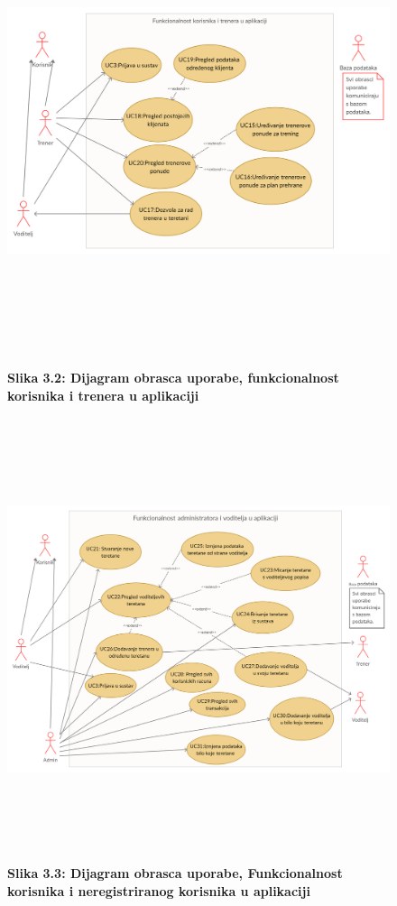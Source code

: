				\begin{figure}
					
					\includegraphics[height=13cm,width=1.2\textwidth]{slike/obrazac2.jpg}
					
					\textbf{Slika 3.2: Dijagram obrasca uporabe, funkcionalnost korisnika i trenera u aplikaciji}
				\end{figure}
				
				\begin{figure}
					\includegraphics[height= 13cm,width=1.2\textwidth]{slike/obrazac3.jpg}
					\textbf{Slika 3.3: Dijagram obrasca uporabe, Funkcionalnost korisnika i neregistriranog korisnika u aplikaciji}
					
				\end{figure}
				
